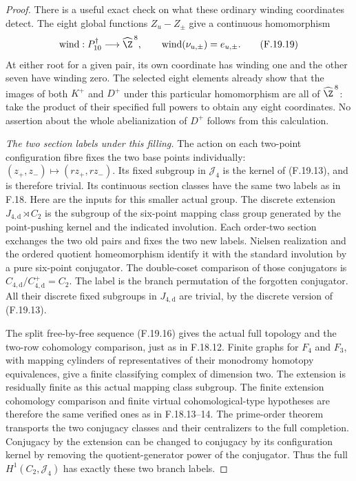 \begin{proof}
There is a useful exact check on what these ordinary
winding coordinates detect.
The eight global functions \(Z_u-Z_\pm\) give
a continuous homomorphism
\[
 \operatorname{wind}:P_{10}^{\dagger}\longrightarrow
                 \widehat\Z^{\,8},\qquad
 \operatorname{wind}(\nu_{u,\pm})=e_{u,\pm}.
                                                               \tag{F.19.19}
\]
At either root for a given pair, its own coordinate
has winding one and the other seven have winding zero.
The selected eight elements already show that the
images of both \(K^+\) and \(D^+\) under this
particular homomorphism are all of
\(\widehat\Z^{\,8}\): take the product of their
specified full powers to obtain any eight coordinates.
No assertion about the whole abelianization of
\(D^+\) follows from this calculation.

\emph{The two section labels under this filling.}
The action on each two-point configuration fibre
fixes the two base points individually:
\((z_+,z_-)\mapsto(rz_+,rz_-)\).
Its fixed subgroup in \(\mathcal J_4\) is the kernel
of (F.19.13), and is therefore trivial.
Its continuous section classes have the same
two labels as in F.18.  Here are the inputs for
this smaller actual group.
The discrete extension
\(J_{4,\mathrm d}\rtimes C_2\) is the subgroup of
the six-point mapping class group generated by
the point-pushing kernel and the indicated involution.
Each order-two section exchanges the two old
pairs and fixes the two new labels.
Nielsen realization and the ordered quotient
homeomorphism identify it with the standard
involution by a pure six-point conjugator.
The double-coset comparison of those conjugators is
\(C_{4,\mathrm d}/C_{4,\mathrm d}^+=C_2\).
The label is the branch permutation of the
forgotten conjugator.
All their discrete fixed subgroups in
\(J_{4,\mathrm d}\) are trivial, by the discrete
version of (F.19.13).

The split free-by-free sequence (F.19.16) gives the
actual full topology and the two-row cohomology
comparison, just as in F.18.12.
Finite graphs for \(F_4\) and \(F_3\), with mapping
cylinders of representatives of their monodromy
homotopy equivalences, give a finite classifying
complex of dimension two.
The extension is residually finite as this actual
mapping class subgroup.  The finite extension
cohomology comparison and finite virtual
cohomological-type hypotheses are therefore the
same verified ones as in F.18.13--14.
The prime-order theorem \cite[Theorem~A]{R-BZ}
transports the two conjugacy classes and their
centralizers to the full completion.
Conjugacy by the extension can be changed to
conjugacy by its configuration kernel by removing
the quotient-generator power of the conjugator.
Thus the full \(H^1(C_2,\mathcal J_4)\) has exactly
these two branch labels.


\end{proof}
